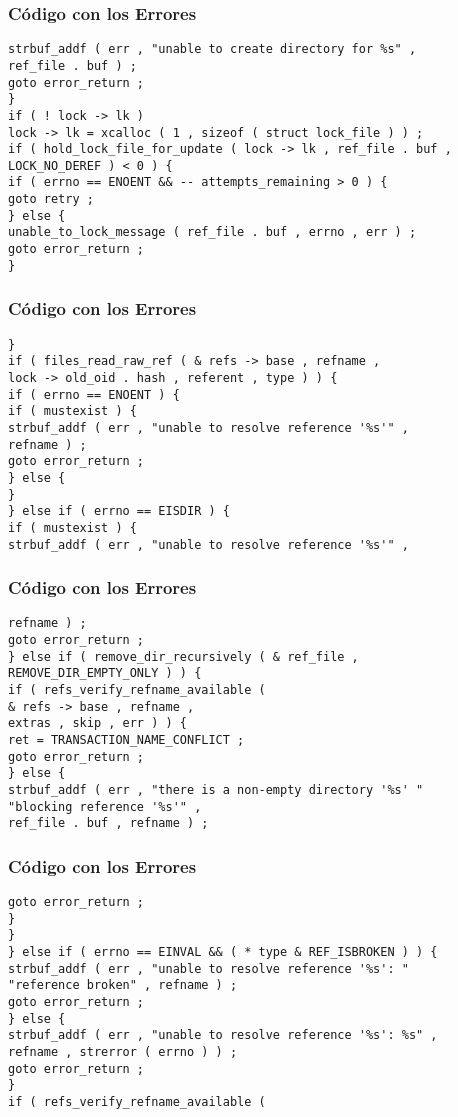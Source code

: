 \documentclass{beamer}
\begin{document}
\begin{frame}[fragile]
\frametitle{C\'odigo con los Errores}
\begin{verbatim}
strbuf_addf ( err , "unable to create directory for %s" , 
ref_file . buf ) ; 
goto error_return ; 
} 
if ( ! lock -> lk ) 
lock -> lk = xcalloc ( 1 , sizeof ( struct lock_file ) ) ; 
if ( hold_lock_file_for_update ( lock -> lk , ref_file . buf , LOCK_NO_DEREF ) < 0 ) { 
if ( errno == ENOENT && -- attempts_remaining > 0 ) { 
goto retry ; 
} else { 
unable_to_lock_message ( ref_file . buf , errno , err ) ; 
goto error_return ; 
} 
\end{verbatim}
\end{frame}
\begin{frame}[fragile]
\frametitle{C\'odigo con los Errores}
\begin{verbatim}
} 
if ( files_read_raw_ref ( & refs -> base , refname , 
lock -> old_oid . hash , referent , type ) ) { 
if ( errno == ENOENT ) { 
if ( mustexist ) { 
strbuf_addf ( err , "unable to resolve reference '%s'" , 
refname ) ; 
goto error_return ; 
} else { 
} 
} else if ( errno == EISDIR ) { 
if ( mustexist ) { 
strbuf_addf ( err , "unable to resolve reference '%s'" , 
\end{verbatim}
\end{frame}
\begin{frame}[fragile]
\frametitle{C\'odigo con los Errores}
\begin{verbatim}
refname ) ; 
goto error_return ; 
} else if ( remove_dir_recursively ( & ref_file , 
REMOVE_DIR_EMPTY_ONLY ) ) { 
if ( refs_verify_refname_available ( 
& refs -> base , refname , 
extras , skip , err ) ) { 
ret = TRANSACTION_NAME_CONFLICT ; 
goto error_return ; 
} else { 
strbuf_addf ( err , "there is a non-empty directory '%s' " 
"blocking reference '%s'" , 
ref_file . buf , refname ) ; 
\end{verbatim}
\end{frame}
\begin{frame}[fragile]
\frametitle{C\'odigo con los Errores}
\begin{verbatim}
goto error_return ; 
} 
} 
} else if ( errno == EINVAL && ( * type & REF_ISBROKEN ) ) { 
strbuf_addf ( err , "unable to resolve reference '%s': " 
"reference broken" , refname ) ; 
goto error_return ; 
} else { 
strbuf_addf ( err , "unable to resolve reference '%s': %s" , 
refname , strerror ( errno ) ) ; 
goto error_return ; 
} 
if ( refs_verify_refname_available ( 
\end{verbatim}
\end{frame}
\end{document}
